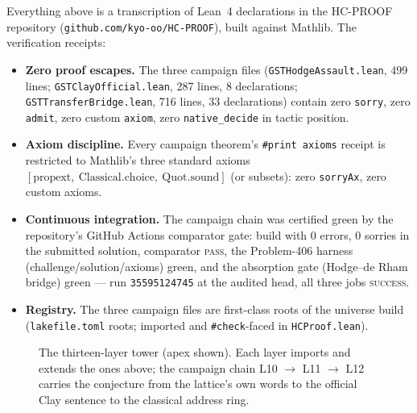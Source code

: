 \documentclass[11pt,a4paper]{article}
\theoremstyle{plain}
\theoremstyle{definition}
\begin{document}
Everything above is a transcription of Lean~4 declarations in the
HC-PROOF repository (\texttt{github.com/kyo-oo/HC-PROOF}), built against
Mathlib. The verification receipts:

\begin{itemize}
\item \textbf{Zero proof escapes.} The three campaign files
  (\texttt{GSTHodgeAssault.lean}, 499 lines;
  \texttt{GSTClayOfficial.lean}, 287 lines, 8 declarations;
  \texttt{GSTTransferBridge.lean}, 716 lines, 33 declarations) contain zero
  \texttt{sorry}, zero \texttt{admit}, zero custom \texttt{axiom}, zero
  \texttt{native\_decide} in tactic position.
\item \textbf{Axiom discipline.} Every campaign theorem's
  \texttt{\#print axioms} receipt is restricted to Mathlib's three standard
  axioms $[\mathrm{propext},\ \mathrm{Classical.choice},\ \mathrm{Quot.sound}]$
  (or subsets): zero \texttt{sorryAx}, zero custom axioms.
\item \textbf{Continuous integration.} The campaign chain was certified
  green by the repository's GitHub Actions comparator gate: build with
  $0$ errors, $0$ sorries in the submitted solution, comparator
  \textsc{pass}, the Problem-406 harness (challenge/solution/axioms) green,
  and the absorption gate (Hodge--de Rham bridge) green --- run
  \texttt{35595124745} at the audited head, all three jobs
  \textsc{success}.
\item \textbf{Registry.} The three campaign files are first-class roots of
  the universe build (\texttt{lakefile.toml} roots; imported and
  \texttt{\#check}-faced in \texttt{HCProof.lean}).
\end{itemize}

\begin{figure}[t]
\centering
{}
\caption{The thirteen-layer tower (apex shown). Each layer imports and
extends the ones above; the campaign chain L10 $\to$ L11 $\to$ L12 carries
the conjecture from the lattice's own words to the official Clay sentence to
the classical address ring.}
\label{fig:tower}
\end{figure}
\end{document}
